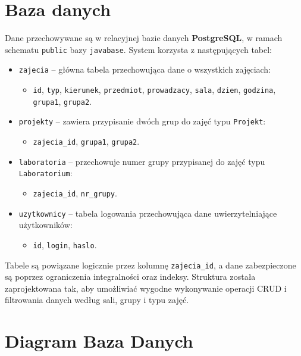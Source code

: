 \section{Baza danych}

Dane przechowywane są w relacyjnej bazie danych \textbf{PostgreSQL}, w ramach schematu \texttt{public} bazy \texttt{javabase}. System korzysta z następujących tabel:

\begin{itemize}
    \item \texttt{zajecia} – główna tabela przechowująca dane o wszystkich zajęciach:
    \begin{itemize}
        \item \texttt{id}, \texttt{typ}, \texttt{kierunek}, \texttt{przedmiot}, \texttt{prowadzacy}, \texttt{sala}, \texttt{dzien}, \texttt{godzina}, \texttt{grupa1}, \texttt{grupa2}.
    \end{itemize}

    \item \texttt{projekty} – zawiera przypisanie dwóch grup do zajęć typu \texttt{Projekt}:
    \begin{itemize}
        \item \texttt{zajecia\_id}, \texttt{grupa1}, \texttt{grupa2}.
    \end{itemize}

    \item \texttt{laboratoria} – przechowuje numer grupy przypisanej do zajęć typu \texttt{Laboratorium}:
    \begin{itemize}
        \item \texttt{zajecia\_id}, \texttt{nr\_grupy}.
    \end{itemize}

    \item \texttt{uzytkownicy} – tabela logowania przechowująca dane uwierzytelniające użytkowników:
    \begin{itemize}
        \item \texttt{id}, \texttt{login}, \texttt{haslo}.
    \end{itemize}
\end{itemize}

Tabele są powiązane logicznie przez kolumnę \texttt{zajecia\_id}, a dane zabezpieczone są poprzez ograniczenia integralności oraz indeksy. Struktura została zaprojektowana tak, aby umożliwiać wygodne wykonywanie operacji CRUD i filtrowania danych według sali, grupy i typu zajęć.

\section{Diagram Baza Danych}

